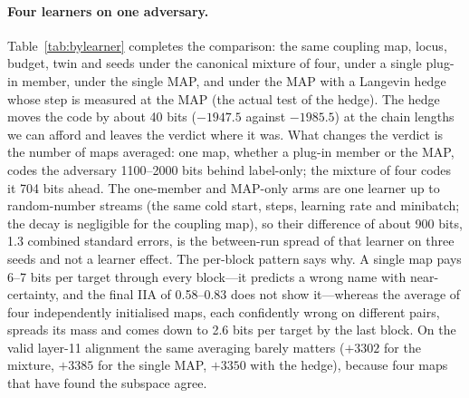 \documentclass[11pt,a4paper]{article}
\begin{document}
\paragraph{Four learners on one adversary.} Table~\ref{tab:bylearner} completes the comparison: the same coupling map, locus, budget, twin and seeds under the canonical mixture of four, under a single plug-in member, under the single MAP, and under the MAP with a Langevin hedge whose step is measured at the MAP (the actual test of the hedge). The hedge moves the code by about 40 bits ($-1947.5$ against $-1985.5$) at the chain lengths we can afford and leaves the verdict where it was. What changes the verdict is the number of maps averaged: one map, whether a plug-in member or the MAP, codes the adversary 1100--2000 bits behind label-only; the mixture of four codes it 704 bits ahead. The one-member and MAP-only arms are one learner up to random-number streams (the same cold start, steps, learning rate and minibatch; the decay is negligible for the coupling map), so their difference of about 900 bits, 1.3 combined standard errors, is the between-run spread of that learner on three seeds and not a learner effect. The per-block pattern says why. A single map pays 6--7 bits per target through every block---it predicts a wrong name with near-certainty, and the final IIA of 0.58--0.83 does not show it---whereas the average of four independently initialised maps, each confidently wrong on different pairs, spreads its mass and comes down to 2.6 bits per target by the last block. On the valid layer-11 alignment the same averaging barely matters ($+3302$ for the mixture, $+3385$ for the single MAP, $+3350$ with the hedge), because four maps that have found the subspace agree.
\end{document}

